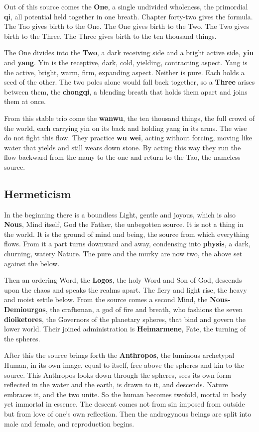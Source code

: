 Out of this source comes the \textbf{One}, a single undivided wholeness, the primordial \textbf{qi}, all potential held together in one breath. Chapter forty-two gives the formula. The Tao gives birth to the One. The One gives birth to the Two. The Two gives birth to the Three. The Three gives birth to the ten thousand things.

The One divides into the \textbf{Two}, a dark receiving side and a bright active side, \textbf{yin} and \textbf{yang}. Yin is the receptive, dark, cold, yielding, contracting aspect. Yang is the active, bright, warm, firm, expanding aspect. Neither is pure. Each holds a seed of the other. The two poles alone would fall back together, so a \textbf{Three} arises between them, the \textbf{chongqi}, a blending breath that holds them apart and joins them at once.

From this stable trio come the \textbf{wanwu}, the ten thousand things, the full crowd of the world, each carrying yin on its back and holding yang in its arms. The wise do not fight this flow. They practice \textbf{wu wei}, acting without forcing, moving like water that yields and still wears down stone. By acting this way they run the flow backward from the many to the one and return to the Tao, the nameless source.

\subsection{Hermeticism}

In the beginning there is a boundless Light, gentle and joyous, which is also \textbf{Nous}, Mind itself, God the Father, the unbegotten source. It is not a thing in the world. It is the ground of mind and being, the source from which everything flows. From it a part turns downward and away, condensing into \textbf{physis}, a dark, churning, watery Nature. The pure and the murky are now two, the above set against the below.

Then an ordering Word, the \textbf{Logos}, the holy Word and Son of God, descends upon the chaos and speaks the realms apart. The fiery and light rise, the heavy and moist settle below. From the source comes a second Mind, the \textbf{Nous-Demiourgos}, the craftsman, a god of fire and breath, who fashions the seven \textbf{dioiketores}, the Governors of the planetary spheres, that bind and govern the lower world. Their joined administration is \textbf{Heimarmene}, Fate, the turning of the spheres.

After this the source brings forth the \textbf{Anthropos}, the luminous archetypal Human, in its own image, equal to itself, free above the spheres and kin to the source. This Anthropos looks down through the spheres, sees its own form reflected in the water and the earth, is drawn to it, and descends. Nature embraces it, and the two unite. So the human becomes twofold, mortal in body yet immortal in essence. The descent comes not from sin imposed from outside but from love of one's own reflection. Then the androgynous beings are split into male and female, and reproduction begins.

